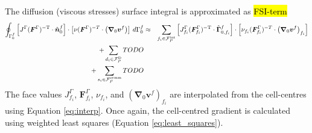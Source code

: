 \documentclass[sn-mathphys,Numbered]{sn-jnl}%
\newcommand{\bb}{\boldsymbol}
\begin{document}
The diffusion (viscous stresses) surface integral is approximated as \hl{FSI-term}
\begin{eqnarray}
	\oint_{\Gamma^f_0}  \left[ J^\Gamma (\bb{F}^\Gamma)^{-\text{T}} \cdot \hat{\bb{n}}_0^f \right]
		\cdot \left[\nu (\bb{F}^\Gamma)^{-T} \cdot \left( \bb{\nabla}_0 \bb{v}^f \right) \right] \, d\Gamma^f_0
		&\approx&
		\sum_{f_i \in \mathcal{F}^{\text{int}}_P}
		\left[ J^\Gamma_{f_i} (\bb{F}^\Gamma_{f_i})^{-\text{T}} \cdot \hat{\bb{\Gamma}}_{0, f_i}^f \right]
			\cdot \left[\nu_{f_i} (\bb{F}^\Gamma_{f_i})^{-T} \cdot \left( \bb{\nabla}_0 \bb{v}^f \right)_{f_i} \right]
			\notag \\
		+ \sum_{d_i \in \mathcal{F}^{\text{D}}_P} TODO \notag \\
		+ \sum_{s_i \in \mathcal{F}^{\text{symm}}_P} TODO 
\end{eqnarray}
The face values $J^\Gamma_{f_i}$, $\bb{F}^\Gamma_{f_i}$, $\nu_{f_i}$, and $\left( \bb{\nabla}_0 \bb{v}^f \right)_{f_i} $ are interpolated from the cell-centres using Equation \ref{eq:interp}.
Once again, the cell-centred gradient is calculated using weighted least squares (Equation \ref{eq:least_squares}).
\end{document}
